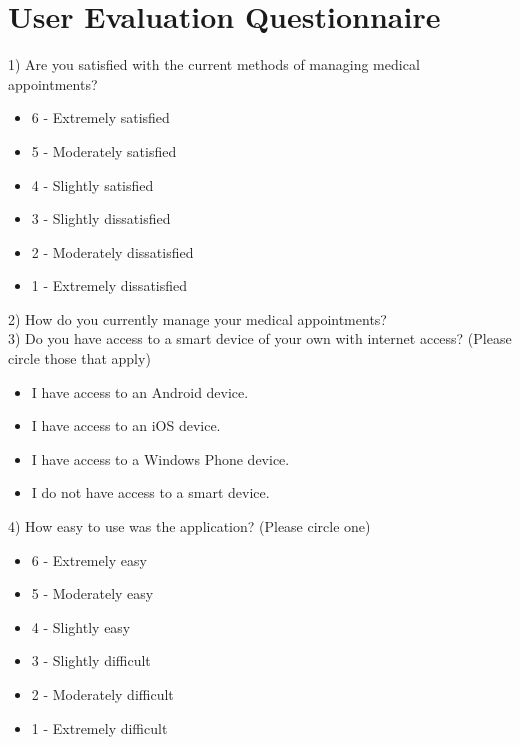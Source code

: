 
\chapter{User Evaluation Questionnaire} %

\label{AppendixF} %


1) Are you satisfied with the current methods of managing medical appointments?

\begin{itemize}
	\item 6 - Extremely satisfied
	\item 5 - Moderately satisfied
	\item 4 - Slightly satisfied
	\item 3 - Slightly dissatisfied
	\item 2 - Moderately dissatisfied
	\item 1 - Extremely dissatisfied
\end{itemize}

2) How do you currently manage your medical appointments?
\\[1in]

3) Do you have access to a smart device of your own with internet access? (Please circle those that apply)

\begin{itemize}
	\item I have access to an Android device.
	\item I have access to an iOS device.
	\item I have access to a Windows Phone device.
	\item I do not have access to a smart device.
\end{itemize}

\newpage

4) How easy to use was the application? (Please circle one)

\begin{itemize}
	\item 6 - Extremely easy
	\item 5 - Moderately easy
	\item 4 - Slightly easy
	\item 3 - Slightly difficult
	\item 2 - Moderately difficult
	\item 1 - Extremely difficult
\end{itemize}

